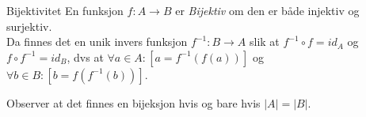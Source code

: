 \begin{frame}{Bijektivitet}
En funksjon $f : A \rightarrow B$ er \emph{Bijektiv} om den er både injektiv og surjektiv.\\
    \pause
    Da finnes det en unik invers funksjon $f^{-1} : B \rightarrow A$ slik at $f^{-1} \circ f = id_A$ og $f \circ f^{-1} = id_B$, dvs at $\forall a \in A : [a = f^{-1}(f(a))]$ og $\forall b \in B : [b = f(f^{-1}(b))]$.
    \pause
\begin{figure}
        \centering
        \qquad
        \qquad
        \qquad
        \label{fig:bij}
    \end{figure}

    \pause
    Observer at det finnes en bijeksjon hvis og bare hvis $|A| = |B|$.
\end{frame}

